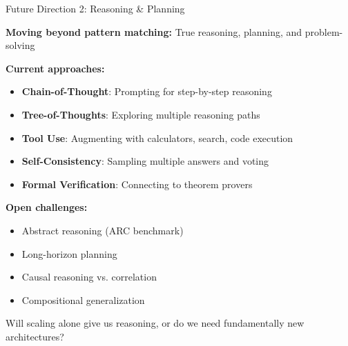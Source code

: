 \documentclass[aspectratio=169]{beamer}
\begin{document}
\begin{frame}[shrink=10]{Future Direction 2: Reasoning \& Planning 🧠}
\begin{futurebox}
\textbf{Moving beyond pattern matching:} True reasoning, planning, and problem-solving
\end{futurebox}

\textbf{Current approaches:}
\begin{itemize}\setlength{\itemsep}{0pt}
    \item \textbf{Chain-of-Thought}: Prompting for step-by-step reasoning
    \item \textbf{Tree-of-Thoughts}: Exploring multiple reasoning paths
    \item \textbf{Tool Use}: Augmenting with calculators, search, code execution
    \item \textbf{Self-Consistency}: Sampling multiple answers and voting
    \item \textbf{Formal Verification}: Connecting to theorem provers
\end{itemize}

\vspace{0.5em}

\textbf{Open challenges:}
\begin{itemize}\setlength{\itemsep}{0pt}
    \item Abstract reasoning (ARC benchmark)
    \item Long-horizon planning
    \item Causal reasoning vs. correlation
    \item Compositional generalization
\end{itemize}

\vspace{0.5em}

\begin{thinkbox}
Will scaling alone give us reasoning, or do we need fundamentally new architectures?
\end{thinkbox}
\end{frame}
\end{document}
